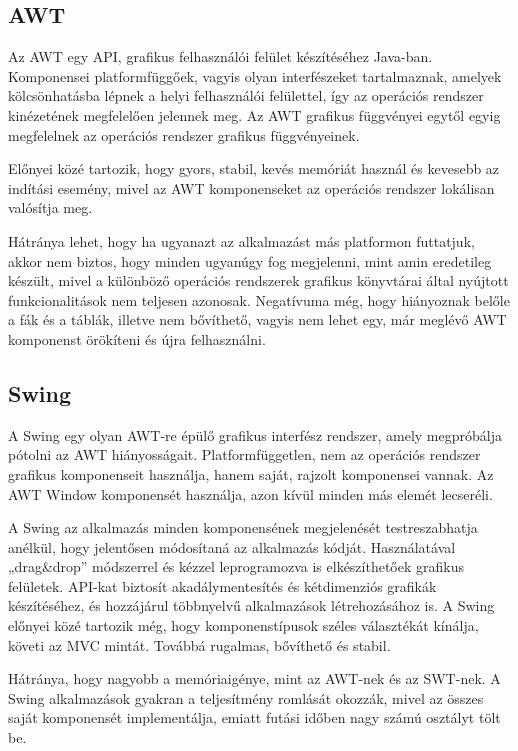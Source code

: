 \subsection*{AWT} 

Az AWT egy API, grafikus felhasználói felület készítéséhez Java-ban. Komponensei platformfüggőek, vagyis olyan interfészeket tartalmaznak, amelyek kölcsönhatásba lépnek a helyi felhasználói felülettel, így az operációs rendszer kinézetének megfelelően jelennek meg. Az AWT grafikus függvényei egytől egyig megfelelnek az operációs rendszer grafikus függvényeinek. 

Előnyei közé tartozik, hogy gyors, stabil, kevés memóriát használ és kevesebb az indítási esemény, mivel az AWT komponenseket az operációs rendszer lokálisan valósítja meg. 

Hátránya lehet, hogy ha ugyanazt az alkalmazást más platformon futtatjuk, akkor nem biztos, hogy minden ugyanúgy fog megjelenni, mint amin eredetileg készült, mivel a különböző operációs rendszerek grafikus könyvtárai által nyújtott funkcionalitások nem teljesen azonosak. Negatívuma még, hogy hiányoznak belőle a fák és a táblák, illetve nem bővíthető, vagyis nem lehet egy, már meglévő AWT komponenst örökíteni és újra felhasználni. 

\subsection*{Swing}

A Swing egy olyan AWT-re épülő grafikus interfész rendszer, amely megpróbálja pótolni az AWT hiányosságait. Platformfüggetlen, nem az operációs rendszer grafikus komponenseit használja, hanem saját, rajzolt komponensei vannak. Az AWT Window komponensét használja, azon kívül minden más elemét lecseréli. 

A Swing az alkalmazás minden komponensének megjelenését testreszabhatja anélkül, hogy jelentősen módosítaná az alkalmazás kódját. Használatával „drag\&drop” módszerrel és kézzel leprogramozva is elkészíthetőek grafikus felületek. API-kat biztosít akadálymentesítés és kétdimenziós grafikák készítéséhez, és hozzájárul többnyelvű alkalmazások létrehozásához is. A Swing előnyei közé tartozik még, hogy komponenstípusok széles választékát kínálja, követi az MVC mintát. Továbbá rugalmas, bővíthető és stabil. 

Hátránya, hogy nagyobb a memóriaigénye, mint az AWT-nek és az SWT-nek. A Swing alkalmazások gyakran a teljesítmény romlását okozzák, mivel az összes saját komponensét implementálja, emiatt futási időben nagy számú osztályt tölt be. 

